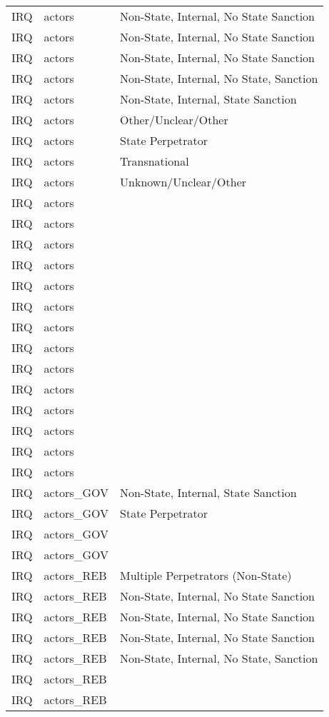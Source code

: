 \begin{table}[ht]
\begin{tabular}{lll}
  IRQ & actors & Non-State, Internal,  No State Sanction \\ 
  IRQ & actors & Non-State, Internal, No State Sanction \\ 
  IRQ & actors & Non-State, Internal, No State Sanction \\ 
  IRQ & actors & Non-State, Internal, No State, Sanction \\ 
  IRQ & actors & Non-State, Internal, State Sanction \\ 
  IRQ & actors & Other/Unclear/Other \\ 
  IRQ & actors & State Perpetrator \\ 
  IRQ & actors & Transnational \\ 
  IRQ & actors & Unknown/Unclear/Other \\ 
  IRQ & actors &  \\ 
  IRQ & actors &  \\ 
  IRQ & actors &  \\ 
  IRQ & actors &  \\ 
  IRQ & actors &  \\ 
  IRQ & actors &  \\ 
  IRQ & actors &  \\ 
  IRQ & actors &  \\ 
  IRQ & actors &  \\ 
  IRQ & actors &  \\ 
  IRQ & actors &  \\ 
  IRQ & actors &  \\ 
  IRQ & actors &  \\ 
  IRQ & actors &  \\ 
  IRQ & actors\_GOV & Non-State, Internal, State Sanction \\ 
  IRQ & actors\_GOV & State Perpetrator \\ 
  IRQ & actors\_GOV &  \\ 
  IRQ & actors\_GOV &  \\ 
  IRQ & actors\_REB & Multiple Perpetrators (Non-State) \\ 
  IRQ & actors\_REB & Non-State, Internal,  No State Sanction \\ 
  IRQ & actors\_REB & Non-State, Internal, No State Sanction \\ 
  IRQ & actors\_REB & Non-State, Internal, No State Sanction \\ 
  IRQ & actors\_REB & Non-State, Internal, No State, Sanction \\ 
  IRQ & actors\_REB &  \\ 
  IRQ & actors\_REB &  \\ 

\end{tabular}
\end{table}
